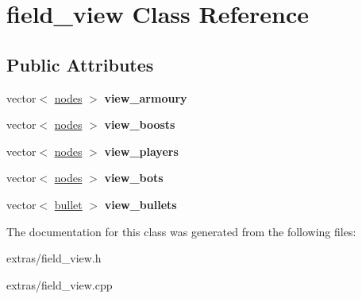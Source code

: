 \hypertarget{classfield__view}{\section{field\+\_\+view Class Reference}
\label{classfield__view}
}
\subsection*{Public Attributes}
\begin{DoxyCompactItemize}
\item 
\hypertarget{classfield__view_aba3b22948c6afa653d063603870d4657}{vector$<$ \hyperlink{classnodes}{nodes} $>$ {\bfseries view\+\_\+armoury}}\label{classfield__view_aba3b22948c6afa653d063603870d4657}

\item 
\hypertarget{classfield__view_a1dc8eff408936eefc37566b769e24d11}{vector$<$ \hyperlink{classnodes}{nodes} $>$ {\bfseries view\+\_\+boosts}}\label{classfield__view_a1dc8eff408936eefc37566b769e24d11}

\item 
\hypertarget{classfield__view_a92cb2f623a85d08e7e9db8864dc6e263}{vector$<$ \hyperlink{classnodes}{nodes} $>$ {\bfseries view\+\_\+players}}\label{classfield__view_a92cb2f623a85d08e7e9db8864dc6e263}

\item 
\hypertarget{classfield__view_ad77bdec931f55de86a7eb149cbde7de8}{vector$<$ \hyperlink{classnodes}{nodes} $>$ {\bfseries view\+\_\+bots}}\label{classfield__view_ad77bdec931f55de86a7eb149cbde7de8}

\item 
\hypertarget{classfield__view_a825b4d475729f4359b1c9aab64632f7e}{vector$<$ \hyperlink{classbullet}{bullet} $>$ {\bfseries view\+\_\+bullets}}\label{classfield__view_a825b4d475729f4359b1c9aab64632f7e}

\end{DoxyCompactItemize}


The documentation for this class was generated from the following files\+:\begin{DoxyCompactItemize}
\item 
extras/field\+\_\+view.\+h\item 
extras/field\+\_\+view.\+cpp\end{DoxyCompactItemize}
